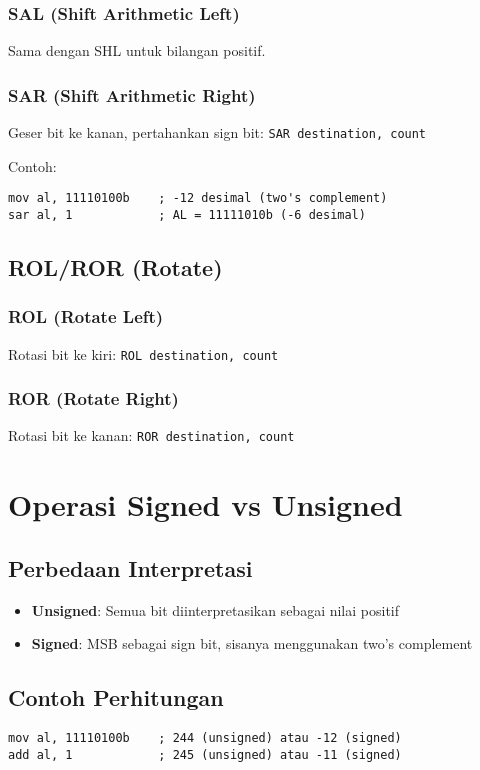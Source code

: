\documentclass[../main.tex]{subfiles}
\begin{document}
\subsubsection{SAL (Shift Arithmetic Left)}
Sama dengan SHL untuk bilangan positif.

\subsubsection{SAR (Shift Arithmetic Right)}
Geser bit ke kanan, pertahankan sign bit: \texttt{SAR destination, count}

Contoh:
\begin{verbatim}
mov al, 11110100b    ; -12 desimal (two's complement)
sar al, 1            ; AL = 11111010b (-6 desimal)
\end{verbatim}

\subsection{ROL/ROR (Rotate)}
\subsubsection{ROL (Rotate Left)}
Rotasi bit ke kiri: \texttt{ROL destination, count}

\subsubsection{ROR (Rotate Right)}
Rotasi bit ke kanan: \texttt{ROR destination, count}

\section{Operasi Signed vs Unsigned}\label{sec:instruksi-dasar-signed}
\subsection{Perbedaan Interpretasi}
\begin{itemize}
    \item \textbf{Unsigned}: Semua bit diinterpretasikan sebagai nilai positif
    \item \textbf{Signed}: MSB sebagai sign bit, sisanya menggunakan two's complement
\end{itemize}

\subsection{Contoh Perhitungan}
\begin{verbatim}
mov al, 11110100b    ; 244 (unsigned) atau -12 (signed)
add al, 1            ; 245 (unsigned) atau -11 (signed)
\end{verbatim}
\end{document}
